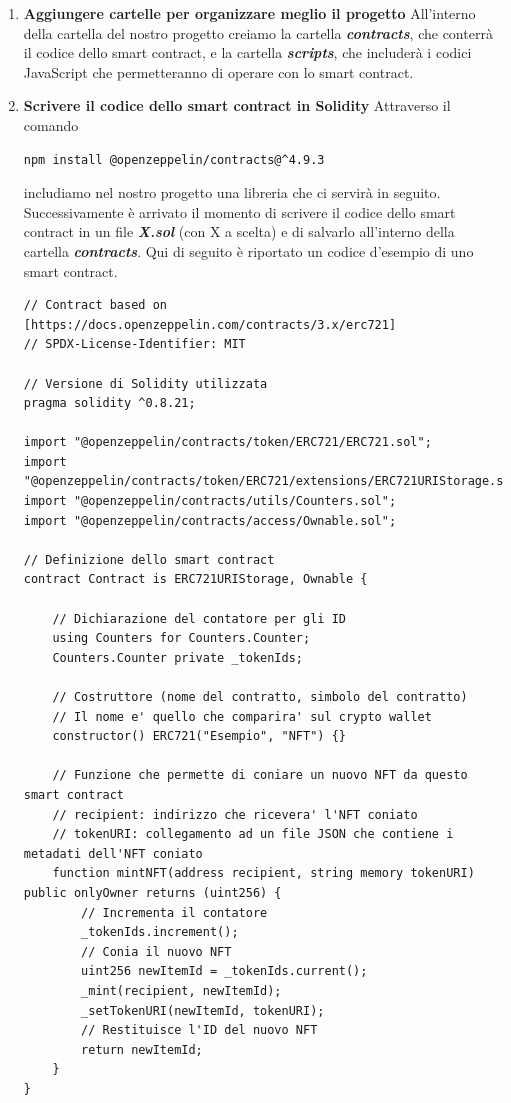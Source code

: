 \documentclass[12pt]{report}
\begin{document}
\begin{enumerate}[topsep=5pt, itemsep=0pt]
\item \textbf{Aggiungere cartelle per organizzare meglio il progetto}\newline
All'interno della cartella del nostro progetto creiamo la cartella \textit{\textbf{contracts}}, che conterrà il codice dello smart contract, e la cartella \textit{\textbf{scripts}}, che includerà i codici JavaScript che permetteranno di operare con lo smart contract.

\item \textbf{Scrivere il codice dello smart contract in Solidity}\newline
Attraverso il comando
\begin{lstlisting}[language=HTML, numbers=none, aboveskip=2pt, belowskip=-3pt]
npm install @openzeppelin/contracts@^4.9.3
\end{lstlisting}
includiamo nel nostro progetto una libreria che ci servirà in seguito.\newline
Successivamente è arrivato il momento di scrivere il codice dello smart contract in un file \textit{\textbf{X.sol}} (con X a scelta) e di salvarlo all'interno della cartella \textit{\textbf{contracts}}.\newline
Qui di seguito è riportato un codice d'esempio di uno smart contract.
\begin{lstlisting}[language=Solidity, aboveskip=2pt]
// Contract based on [https://docs.openzeppelin.com/contracts/3.x/erc721]
// SPDX-License-Identifier: MIT

// Versione di Solidity utilizzata
pragma solidity ^0.8.21;

import "@openzeppelin/contracts/token/ERC721/ERC721.sol";
import "@openzeppelin/contracts/token/ERC721/extensions/ERC721URIStorage.sol";
import "@openzeppelin/contracts/utils/Counters.sol";
import "@openzeppelin/contracts/access/Ownable.sol";

// Definizione dello smart contract
contract Contract is ERC721URIStorage, Ownable {

    // Dichiarazione del contatore per gli ID
    using Counters for Counters.Counter;
    Counters.Counter private _tokenIds;

    // Costruttore (nome del contratto, simbolo del contratto)
    // Il nome e' quello che comparira' sul crypto wallet
    constructor() ERC721("Esempio", "NFT") {}

    // Funzione che permette di coniare un nuovo NFT da questo smart contract
    // recipient: indirizzo che ricevera' l'NFT coniato
    // tokenURI: collegamento ad un file JSON che contiene i metadati dell'NFT coniato
    function mintNFT(address recipient, string memory tokenURI) public onlyOwner returns (uint256) {
        // Incrementa il contatore
        _tokenIds.increment();
        // Conia il nuovo NFT
        uint256 newItemId = _tokenIds.current();
        _mint(recipient, newItemId);
        _setTokenURI(newItemId, tokenURI);
        // Restituisce l'ID del nuovo NFT
        return newItemId;
    }
}
\end{lstlisting}


\end{enumerate}
\end{document}
